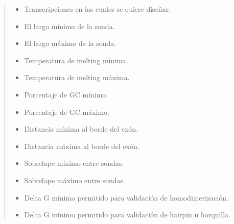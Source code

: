 \documentclass[letterpaper,10pt,spanish]{sphinxmanual}
\begin{document}
\begin{fulllineitems}
\begin{quote}
\begin{description}
\begin{itemize}
\item {} 
\sphinxAtStartPar
{} \textendash{} Transcripciones en las cuales se quiere diseñar.

\item {} 
\sphinxAtStartPar
{} \textendash{} El largo mínimo de la sonda.

\item {} 
\sphinxAtStartPar
{} \textendash{} El largo máximo de la sonda.

\item {} 
\sphinxAtStartPar
{} \textendash{} Temperatura de melting mínima.

\item {} 
\sphinxAtStartPar
{} \textendash{} Temperatura de melting máxima.

\item {} 
\sphinxAtStartPar
{} \textendash{} Porcentaje de GC mínimo.

\item {} 
\sphinxAtStartPar
{} \textendash{} Porcentaje de GC máximo.

\item {} 
\sphinxAtStartPar
{} \textendash{} Distancia mínima al borde del exón.

\item {} 
\sphinxAtStartPar
{} \textendash{} Distancia máxima al borde del exón.

\item {} 
\sphinxAtStartPar
{} \textendash{} Sobrelape mínimo entre sondas.

\item {} 
\sphinxAtStartPar
{} \textendash{} Sobrelape máximo entre sondas.

\item {} 
\sphinxAtStartPar
{} \textendash{} Delta G mínimo permitido para validación de homodimerización.

\item {} 
\sphinxAtStartPar
{} \textendash{} Delta G mínimo permitido para validación de hairpin u horquilla.


\end{itemize}
\end{description}
\end{quote}
\end{fulllineitems}
\end{document}
